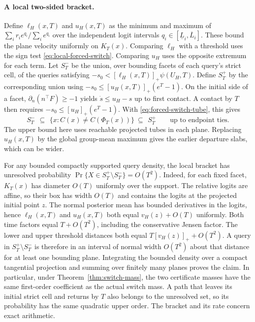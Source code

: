 \paragraph{A local two-sided bracket.}
Define $\ell_H(x,T)$ and $u_H(x,T)$ as the minimum and maximum of
$\sum_i r_i e^{q_i}/\sum_i e^{q_i}$ over the independent logit intervals
$q_i\in[\underline L_i,\overline L_i]$. These bound the plane velocity
uniformly on $K_T(x)$. Comparing $\ell_H$ with a threshold uses the
sign test \eqref{eq:local-forced-switch}. Comparing $u_H$ uses the
opposite extremum for each term. Let $S_T^{-}$ be the union, over
bounding facets of each query's strict cell, of the queries satisfying
$-s_0<[\ell_H(x,T)]_+\psi(U_H,T)$. Define $S_T^{+}$ by the corresponding
union using $-s_0\le [u_H(x,T)]_+(e^T-1)$. On the initial side of a facet,
$\partial_n(n^\top F)\ge-1$ yields $\dot s\le u_H-s$ up to first contact.
A contact by $T$ then requires $-s_0\le [u_H]_+(e^T-1)$. With
\eqref{eq:forced-switch-tube}, this gives
\begin{equation}
 S_T^-\ \,\subseteq\ \,\{x:C(x)\ne C(\Phi_T(x))\}\ \subseteq\ \, S_T^+
 \qquad\text{up to endpoint ties}.
 \label{eq:local-switch-bracket}
\end{equation}
The upper bound here uses reachable projected tubes in each plane.
Replacing $u_H(x,T)$ by the global group-mean maximum gives the earlier
departure slabs, which can be wider.

For any bounded compactly supported query density, the local bracket
has unresolved probability $\Pr\{X\in S_T^+\setminus S_T^-\}=O(T^2)$.
Indeed, for each fixed facet, $K_T(x)$ has diameter $O(T)$ uniformly
over the support. The relative logits are affine, so their box has
width $O(T)$ and contains the logits at the projected initial point
$z$. The normal posterior mean has bounded derivatives in the logits,
hence $\ell_H(x,T)$ and $u_H(x,T)$ both equal $v_H(z)+O(T)$ uniformly.
Both time factors equal $T+O(T^2)$, including the conservative Jensen
factor. The lower and upper threshold distances both equal
$T[v_H(z)]_++O(T^2)$. A query in $S_T^+\setminus S_T^-$ is therefore in
an interval of normal width $O(T^2)$ about that distance for at least
one bounding plane. Integrating the bounded density over a compact
tangential projection and summing over finitely many planes proves the
claim. In particular, under Theorem~\ref{thm:switch-mass}, the two
certificate masses have the same first-order coefficient as the
actual switch mass. A path that leaves its initial strict cell and
returns by $T$ also belongs to the unresolved set, so its probability
has the same quadratic upper order. The bracket and its rate concern
exact arithmetic.
